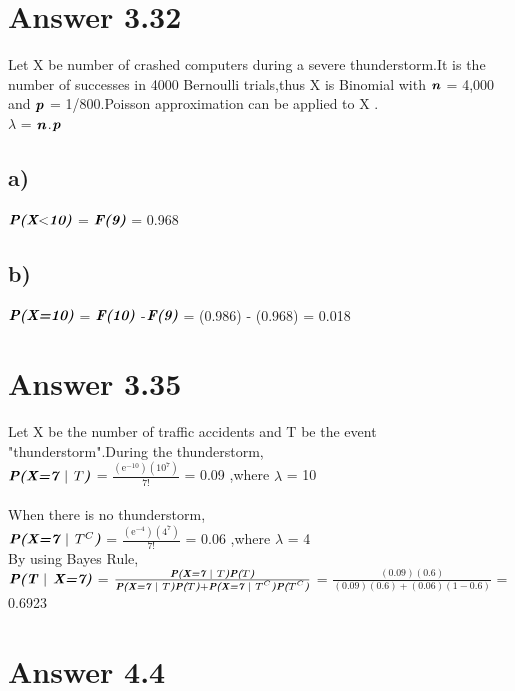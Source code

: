 \documentclass[12pt]{article}
\begin{document}
\section*{Answer 3.32}Let X be number of crashed computers during a severe thunderstorm.It is the number of successes in 4000 Bernoulli trials,thus X is Binomial with $\textbf{\textit{n}}$ = 4,000 and $\textbf{\textit{p}}$ = 1/800.Poisson approximation can be applied to X .\\

$\lambda$ = $\textbf{\textit{n}}$.$\textbf{\textit{p}}$ 
\subsection*{a)}$\textbf{\textit{P(X$<$10)}}$ = $\textbf{\textit{F(9)}}$ = 0.968
\subsection*{b)}$\textbf{\textit{P(X=10)}}$ = $\textbf{\textit{F(10)}}$ -$\textbf{\textit{F(9)}}$ = (0.986) - (0.968) = 0.018

\section*{Answer 3.35} Let X be the number of traffic accidents and T be the event "thunderstorm".During the thunderstorm,\\

$\textbf{\textit{P(X=7 $\vert$ $T$)}}$ = $\frac{(\mathrm{e}^{-10})(10^7)}{7!}$ = 0.09 ,where $\lambda$ = 10\\\\
When there is no thunderstorm,\\

$\textbf{\textit{P(X=7 $\vert$ $T^C$)}}$ = $\frac{(\mathrm{e}^{-4})(4^7)}{7!}$ = 0.06 ,where $\lambda$ = 4\\

By using Bayes Rule,\\

{\large $\textbf{\textit{P(T $\vert$ X=7)}}$ = $\frac{\textbf{\textit{P(X=7 $\vert$ $T$)}} \textbf{\textit{P($T$)}}}{\textbf{\textit{P(X=7 $\vert$ $T$)}} \textbf{\textit{P($T$)}}+\textbf{\textit{P(X=7 $\vert$ $T^C$)}}\textbf{\textit{P($T^C$)}}}$ = $\frac{(0.09)(0.6)}{(0.09)(0.6)+(0.06)(1-0.6)}$ = 0.6923 }

\section*{Answer 4.4}
\end{document}

